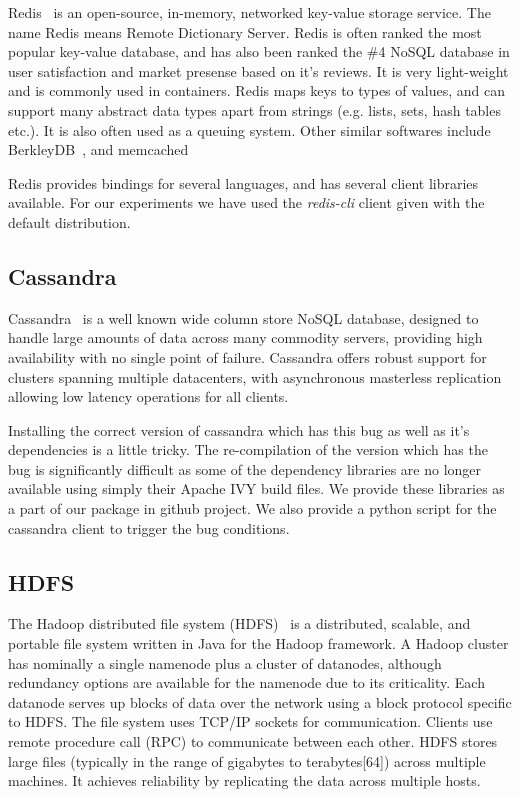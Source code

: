 Redis~\cite{redis} is an open-source, in-memory, networked key-value storage service. 
The name Redis means Remote Dictionary Server. 
Redis is often ranked the most popular key-value database, and has also been ranked the \#4 NoSQL database in user satisfaction and market presense based on it's reviews. 
It is very light-weight and is commonly used in containers.
Redis maps keys to types of values, and can support many abstract data types apart from strings (e.g. lists, sets, hash tables etc.).
It is also often used as a queuing system.
Other similar softwares include BerkleyDB~\cite{berkleyDB}, and memcached~\cite{memcached}

Redis provides bindings for several languages, and has several client libraries available. 
For our experiments we have used the \emph{redis-cli} client given with the default distribution.

\subsection{Cassandra}

Cassandra~\cite{cassandra} is a well known wide column store NoSQL database, designed to handle large amounts of data across many commodity servers, providing high availability with no single point of failure.
Cassandra offers robust support for clusters spanning multiple datacenters, with asynchronous masterless replication allowing low latency operations for all clients.

Installing the correct version of cassandra which has this bug as well as it's dependencies is a little tricky. The re-compilation of the version which has the bug is significantly difficult as some of the dependency libraries are no longer available using simply their Apache IVY build files. We provide these libraries as a part of our package in github project. We also provide a python script for the cassandra client to trigger the bug conditions.

\subsection{HDFS}

The Hadoop distributed file system (HDFS)~\cite{hdfs} is a distributed, scalable, and portable file system written in Java for the Hadoop framework.
A Hadoop cluster has nominally a single namenode plus a cluster of datanodes, although redundancy options are available for the namenode due to its criticality. 
Each datanode serves up blocks of data over the network using a block protocol specific to HDFS. The file system uses TCP/IP sockets for communication. Clients use remote procedure call (RPC) to communicate between each other.
HDFS stores large files (typically in the range of gigabytes to terabytes[64]) across multiple machines. It achieves reliability by replicating the data across multiple hosts.


